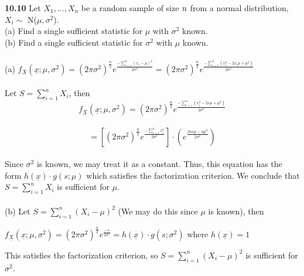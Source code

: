 
{ \bf 10.10 } Let $ X_{1}, \ldots, X_{n} $ be a random sample of size $ \it{n} $ from a normal distribution, $ X_{i} \sim $ N($ \mu, \sigma^{2} $).
\\ \indent (a) Find a single sufficient statistic for $ \mu $ with $ \sigma^{2} $ known.
\\ \indent (b) Find a single sufficient statistic for $ \sigma^{2} $ with $ \mu $ known.
\\
\\ (a) $ f_{\underline{X}}(\underline{x}; \mu, \sigma^{2}) = (2 \pi \sigma^{2})^{\frac{n}{2}} e^{\frac{-\sum_{i=1}^{n}(x_{i}-\mu)^{2}}{2 \sigma^{2}}} = (2 \pi \sigma^{2})^{\frac{n}{2}} e^{\frac{-\sum_{i=1}^{n}(x_{i}^{2}- 2x_{i}\mu+\mu^{2})}{2 \sigma^{2}}} $
\\
\\ \indent Let $ S = \sum_{i=1}^{n}X_{i} $, then
\ $$ f_{\underline{X}}(\underline{x}; \mu, \sigma^{2}) = (2 \pi \sigma^{2})^{\frac{n}{2}} e^{\frac{-\sum_{i=1}^{n}(x_{i}^{2}- 2s\mu+\mu^{2})}{2 \sigma^{2}}} $$
\ $$ = \left[(2 \pi \sigma^{2})^{\frac{n}{2}} e^{\frac{-\sum_{i=1}^{n}x_{i}^{2}}{2 \sigma^{2}}} \right] \cdot \left(e^{\frac{2ns\mu - n\mu^{2}}{2 \sigma^{2}}} \right) $$
\\ \indent Since $ \sigma^{2} $ is known, we may treat it as a constant.  Thus, this equation has the form $ h(\underline{x}) \cdot g(s;\mu) $ which satisfies the factorization criterion.  We conclude that $ S = \sum_{i=1}^{n}X_{i} $ is sufficient for $ \mu $.
\\
\\ (b) Let $ S = \sum_{i=1}^{n}(X_{i}-\mu)^{2} $ (We may do this since $ \mu $ is known), then
\\
\begin{center}

 $ f_{\underline{X}}(\underline{x}; \mu, \sigma^{2}) = (2 \pi \sigma^{2})^{\frac{n}{2}} e^{\frac{-s}{2 \sigma^{2}}} = h(\underline{x}) \cdot g(s;\sigma^{2}) $ where $ h(\underline{x}) = 1 $

\end{center}

This satisfies the factorization criterion, so $ S = \sum_{i=1}^{n}(X_{i}-\mu)^{2} $ is sufficient for $ \sigma^{2} $.